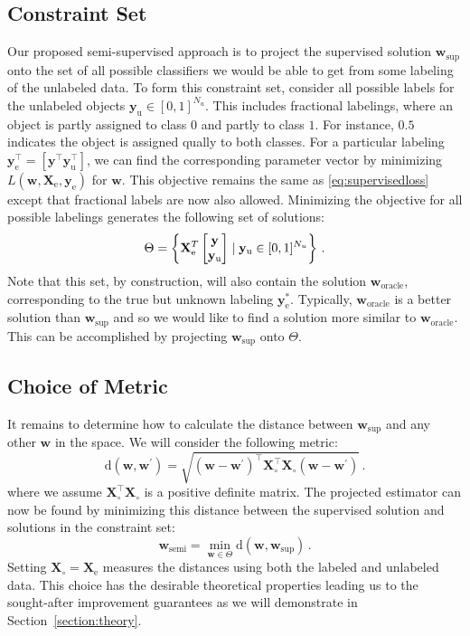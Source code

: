 \documentclass[twoside]{memoir}\usepackage[]{graphicx}\usepackage{xcolor}
\newcommand{\Xe}{\mathbf{X}_\mathrm{e}  }
\newcommand{\XeT}{\mathbf{X}_\mathrm{e}^T}
\newcommand{\ye}{\begin{bmatrix} \mathbf{y}  \\ \mathbf{y}_\textrm{u} \end{bmatrix}}
\let\G\relax
\newcommand{\G}{\left(\Xe^T \Xe \right)^{-1}}
\renewcommand{\vec}{\mathbf}
\begin{document}
\subsection{Constraint Set}
Our proposed semi-supervised approach is to project the supervised solution $\vec{w}_\text{sup}$ onto the set of all possible classifiers we would be able to get from some labeling of the unlabeled data. To form this constraint set, consider all possible labels for the unlabeled objects $\vec{y}_\text{u} \in [0,1]^{N_u}$. This includes fractional labelings, where an object is partly assigned to class $0$ and partly to class $1$. For instance, $0.5$ indicates the object is assigned qually to both classes. For a particular labeling $\vec{y}_\text{e}^\top = \left[ \vec{y}^\top \vec{y}_\text{u}^\top \right]$, we can find the corresponding parameter vector by minimizing $L(\vec{w},\vec{X}_\text{e},\vec{y}_\text{e})$ for $\vec{w}$.
This objective remains the same as \eqref{eq:supervisedloss} except that fractional labels are now also allowed. Minimizing the objective for all possible labelings generates the following set of solutions:
\begin{equation}
\label{eq:constrainedregion}
\Theta=\left\{ \G \XeT \ye \mid \vec{y}_\text{u} \in [0,1]^{N_u} \right\} \, .
\end{equation}
Note that this set, by construction, will also contain the solution $\vec{w}_\text{oracle}$, corresponding to the true but unknown labeling $\vec{y}_\text{e}^{\ast}$. Typically, $\vec{w}_\text{oracle}$ is a better solution than $\vec{w}_\text{sup}$ and so we would like to find a solution more similar to $\vec{w}_\text{oracle}$. This can be accomplished by projecting $\vec{w}_\text{sup}$ onto $\Theta$.

\subsection{Choice of Metric}
It remains to determine how to calculate the distance between $\vec{w}_\text{sup}$ and any other $\vec{w}$ in the space. We will consider the following metric:
\begin{equation}
\label{eq:metric}
\text{d}(\vec{w},\vec{w}^\prime)=\sqrt{\left( \vec{w}-\vec{w}^\prime \right)^\top \vec{X}_{\circ}^\top \vec{X}_{\circ}  \left( \vec{w}-\vec{w}^\prime \right)} \,.
\end{equation}
where we assume $\vec{X}_{\circ}^\top \vec{X}_{\circ}$ is a positive definite matrix. The projected estimator can now be found by minimizing this distance between the supervised solution and solutions in the constraint set:
\begin{equation}
\label{eq:projection}
\vec{w}_\mathrm{semi} = \min_{\vec{w} \in \Theta} \text{d}(\vec{w},\vec{w}_\text{sup})\,.
\end{equation}
Setting $\vec{X}_\circ=\Xe$ measures the distances using both the labeled and unlabeled data. This choice has the desirable theoretical properties leading us to the sought-after improvement guarantees as we will demonstrate in Section~\ref{section:theory}.
\end{document}
